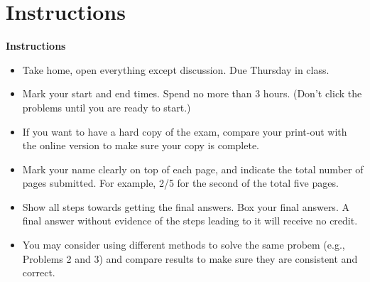 \begin{comment}
\begin{tabular}{l}
.  \\
.  \\
.  \\
\end{tabular}
\vskip 5cm

\item {\bf What did not go well for your learning in the course? Be specific.}
\begin{tabular}{l}
.  \\
.  \\
.  \\
\end{tabular}
\vskip 0.9in

\item {\bf Indicate one thing you want to improve and how.}
\begin{tabular}{l}
.  \\
.  \\
.  \\
\end{tabular}
\vskip 0.9in

\end{itemize}

\end{itemize}
\end{comment}


\section*{Instructions}

{\bf Instructions}
\begin{itemize}
\item Take home, open everything except discussion. Due Thursday in class.
\item Mark your start and end times. Spend no more than 3 hours.
  (Don't click the problems until you are ready to start.)
\item If you want to have a hard copy of the exam, compare your print-out
  with the online version to make sure your copy is complete.
\item Mark your name clearly on top of each page, and indicate the total
  number of pages submitted. For example, 2/5 for the second of the total 
  five pages.
\item Show all steps towards getting the final answers. Box your final 
  answers. A final answer without evidence of the steps leading to it 
  will receive no credit.
\item You may consider using different methods to solve the same probem 
  (e.g., Problems 2 and 3) and compare results to make sure they are 
  consistent and correct.
\end{itemize}

